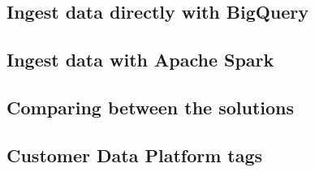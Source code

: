 \subsection{Ingest data directly with BigQuery}

\subsection{Ingest data with Apache Spark}

\subsection{Comparing between the solutions}

\subsection{Customer Data Platform tags}
